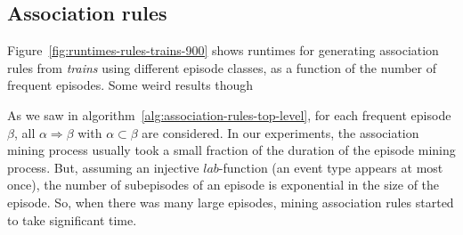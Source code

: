\fi

\subsection{Association rules}

Figure~\ref{fig:runtimes-rules-trains-900} shows runtimes for generating association rules from \emph{trains} using different episode classes, as a function of the number of frequent episodes. Some weird results though %

As we saw in algorithm~\ref{alg:association-rules-top-level}, for each frequent episode $ \beta $, all $ \alpha \Rightarrow \beta $ with $ \alpha \subset \beta $ are considered. In our experiments, the association mining process usually took a small fraction of the duration of the episode mining process. But, assuming an injective $ lab $-function (an event type appears at most once), the number of subepisodes of an episode is exponential in the size of the episode. So, when there was many large episodes, mining association rules started to take significant time.

